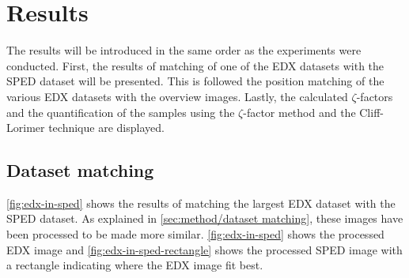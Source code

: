 \chapter{Results}

The results will be introduced in the same order as the experiments were conducted. First, the results of matching of one of the EDX datasets with the SPED dataset will be presented. This is followed the position matching of the various EDX datasets with the overview images. Lastly, the calculated $\zeta$-factors and the quantification of the samples using the $\zeta$-factor method and the Cliff-Lorimer technique are displayed.

\section{Dataset matching}

\cref{fig:edx-in-sped} shows the results of matching the largest EDX dataset with the SPED dataset. As explained in \cref{sec:method/dataset matching}, these images have been processed to be made more similar. \cref{fig:edx-in-sped} shows the processed EDX image and \cref{fig:edx-in-sped-rectangle} shows the processed SPED image with a rectangle indicating where the EDX image fit best. 

